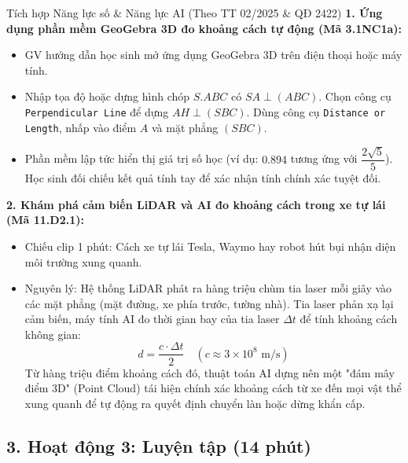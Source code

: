 \documentclass[12pt, a4paper]{article}
\begin{document}
\begin{aibox}{Tích hợp Năng lực số \& Năng lực AI (Theo TT 02/2025 \& QĐ 2422)}
    \textbf{1. Ứng dụng phần mềm GeoGebra 3D đo khoảng cách tự động (Mã 3.1NC1a):}
    \begin{itemize}[leftmargin=0.6cm]
        \item GV hướng dẫn học sinh mở ứng dụng GeoGebra 3D trên điện thoại hoặc máy tính.
        \item Nhập tọa độ hoặc dựng hình chóp $S.ABC$ có $SA \perp (ABC)$. Chọn công cụ \texttt{Perpendicular Line} để dựng $AH \perp (SBC)$. Dùng công cụ \texttt{Distance or Length}, nhấp vào điểm $A$ và mặt phẳng $(SBC)$.
        \item Phần mềm lập tức hiển thị giá trị số học (ví dụ: $0.894$ tương ứng với $\dfrac{2\sqrt{5}}{5}$). Học sinh đối chiếu kết quả tính tay để xác nhận tính chính xác tuyệt đối.
    \end{itemize}

    \textbf{2. Khám phá cảm biến LiDAR và AI đo khoảng cách trong xe tự lái (Mã 11.D2.1):}
    \begin{itemize}[leftmargin=0.6cm]
        \item Chiếu clip 1 phút: Cách xe tự lái Tesla, Waymo hay robot hút bụi nhận diện môi trường xung quanh.
        \item Nguyên lý: Hệ thống LiDAR phát ra hàng triệu chùm tia laser mỗi giây vào các mặt phẳng (mặt đường, xe phía trước, tường nhà). Tia laser phản xạ lại cảm biến, máy tính AI đo thời gian bay của tia laser $\Delta t$ để tính khoảng cách không gian:
        $$d = \dfrac{c \cdot \Delta t}{2} \quad (c \approx 3 \times 10^8\text{ m/s})$$
        Từ hàng triệu điểm khoảng cách đó, thuật toán AI dựng nên một "đám mây điểm 3D" (Point Cloud) tái hiện chính xác khoảng cách từ xe đến mọi vật thể xung quanh để tự động ra quyết định chuyển làn hoặc dừng khẩn cấp.
    \end{itemize}
\end{aibox}

\subsection*{3. Hoạt động 3: Luyện tập (14 phút)}
\end{document}
